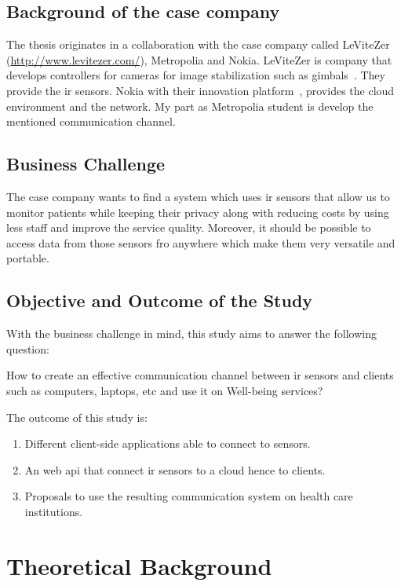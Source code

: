 \documentclass[hidelinks,11pt,a4paper,oneside,article]{memoir}
\begin{document}
\section{Background of the case company}
The thesis originates in a collaboration with the case company called LeViteZer (\url{http://www.levitezer.com/}), Metropolia and Nokia.
 LeViteZer is company that develops controllers for cameras for image stabilization such as gimbals~\cite{levitezer}. They provide the \gls{ir} sensors. Nokia with their innovation platform~\cite{nokiainnovation}, provides the cloud environment and the network. My part as Metropolia student is develop the mentioned communication channel.



\section{Business Challenge}\label{sec:business-challenge}
The case company wants to find a system which uses \gls{ir} sensors that allow us to monitor patients while keeping their privacy along with reducing costs by using less staff and improve the service quality. Moreover, it should be possible to access data from those sensors fro anywhere which make them very versatile and portable.
\section{Objective and Outcome of the Study}
With the business challenge in mind, this study aims to answer the following question:
\begin{displayquote}
{\large  How to create an effective communication channel between ir sensors and clients such as computers, laptops, etc and use it on Well-being services?}
\end{displayquote}

The outcome of this study is:
\begin{enumerate}
\item Different client-side applications able to connect to sensors.
\item An web \gls{api} that connect \gls{ir} sensors to a cloud hence to clients.
\item Proposals to use the resulting communication system on health care institutions.
\end{enumerate}



\clearpage\chapter{Theoretical Background}\label{sec:theoretical-background}
\end{document}
